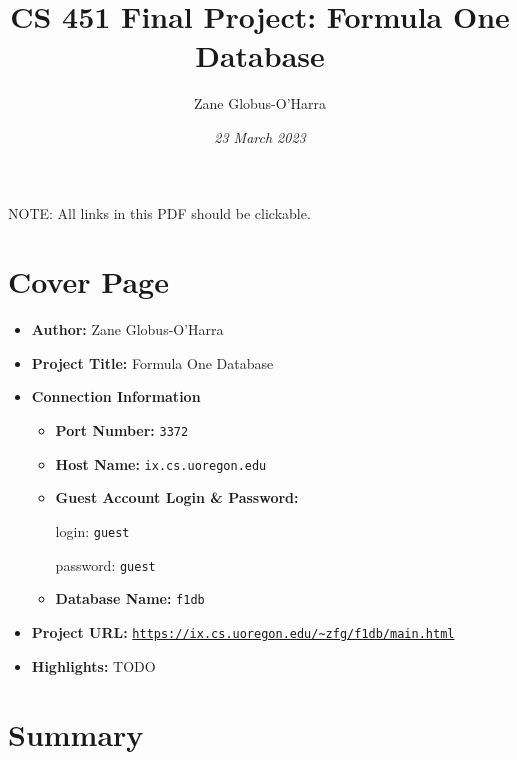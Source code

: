 \documentclass{article} %
\title{CS 451 Final Project: Formula One Database}
\author{Zane Globus-O'Harra}
\date{\textit{23 March 2023}}
\begin{document}
\maketitle
\thispagestyle{empty}

\tableofcontents
\thispagestyle{empty}
\vspace{1.5cm}

\noindent
NOTE: All links in this PDF should be clickable.
\newpage


\section{Cover Page}

\begin{itemize}
    \item \textbf{Author:} Zane Globus-O'Harra
    
    \item \textbf{Project Title:} Formula One Database

    \item \textbf{Connection Information}
    \begin{itemize}
        \item \textbf{Port Number:} \texttt{3372}

        \item \textbf{Host Name:} \texttt{ix.cs.uoregon.edu}

        \item \textbf{Guest Account Login \& Password:} 

        login: \texttt{guest}

        password: \texttt{guest}

        \item \textbf{Database Name:} \texttt{f1db}

    \end{itemize}

    \item \textbf{Project URL:}
    \href{https://ix.cs.uoregon.edu/~zfg/f1db/main.html}{\texttt{https://ix.cs.uoregon.edu/\~{}zfg/f1db/main.html}}

    \item \textbf{Highlights:} TODO
\end{itemize}

\section{Summary}
\end{document}
